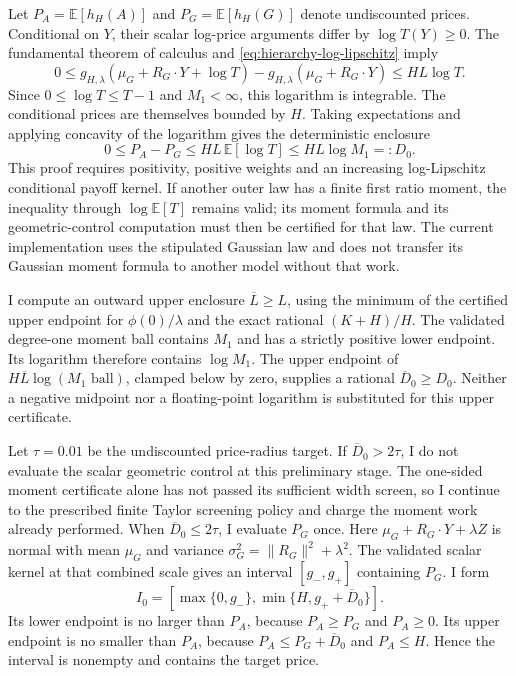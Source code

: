 Let $P_A=\mathbb E[h_H(A)]$ and $P_G=\mathbb E[h_H(G)]$ denote undiscounted
prices. Conditional on $Y$, their scalar log-price arguments differ by
$\log T(Y)\geq0$. The fundamental theorem of calculus and
\eqref{eq:hierarchy-log-lipschitz} imply
\[
 0\leq g_{H,\lambda}(\mu_G+R_G\cdot Y+\log T)
       -g_{H,\lambda}(\mu_G+R_G\cdot Y)
 \leq H L\log T.
\]
Since $0\leq\log T\leq T-1$ and $M_1<\infty$, this logarithm is integrable.
The conditional prices are themselves bounded by $H$. Taking expectations
and applying concavity of the logarithm gives the deterministic enclosure
\begin{equation}
 0\leq P_A-P_G\leq H L\,\mathbb E[\log T]
                    \leq H L\log M_1=:D_0.
 \label{eq:hierarchy-one-sided-gap}
\end{equation}
This proof requires positivity, positive weights and an increasing
log-Lipschitz conditional payoff kernel. If another outer law has a finite
first ratio moment, the inequality through $\log\mathbb E[T]$ remains
valid; its moment formula and its geometric-control computation must then
be certified for that law. The current implementation uses the stipulated
Gaussian law and does not transfer its Gaussian moment formula to another
model without that work.

I compute an outward upper enclosure $\overline L\geq L$, using the minimum
of the certified upper endpoint for $\phi(0)/\lambda$ and the exact rational
$(K+H)/H$. The validated degree-one moment ball contains $M_1$ and has a
strictly positive lower endpoint. Its logarithm therefore contains
$\log M_1$. The upper endpoint of
$H\overline L\log(M_1\text{ ball})$, clamped below by zero, supplies a
rational $\overline D_0\geq D_0$. Neither a negative midpoint nor a
floating-point logarithm is substituted for this upper certificate.

Let $\tau=0.01$ be the undiscounted price-radius target. If
$\overline D_0>2\tau$, I do not evaluate the scalar geometric control at
this preliminary stage. The one-sided moment certificate alone has not
passed its sufficient width screen, so I continue to the prescribed finite
Taylor screening policy and charge the moment work already performed.
When $\overline D_0\leq2\tau$, I evaluate $P_G$ once. Here
$\mu_G+R_G\cdot Y+\lambda Z$ is normal with mean $\mu_G$ and variance
$\sigma_G^2=\|R_G\|^2+\lambda^2$. The validated scalar kernel at that
combined scale gives an interval $[g_-,g_+]$ containing $P_G$. I form
\begin{equation}
 I_0=\left[\max\{0,g_-\},
          \min\{H,g_++\overline D_0\}\right].
 \label{eq:hierarchy-one-sided-price-interval}
\end{equation}
Its lower endpoint is no larger than $P_A$, because $P_A\geq P_G$ and
$P_A\geq0$. Its upper endpoint is no smaller than $P_A$, because
$P_A\leq P_G+\overline D_0$ and $P_A\leq H$. Hence the interval is
nonempty and contains the target price.

